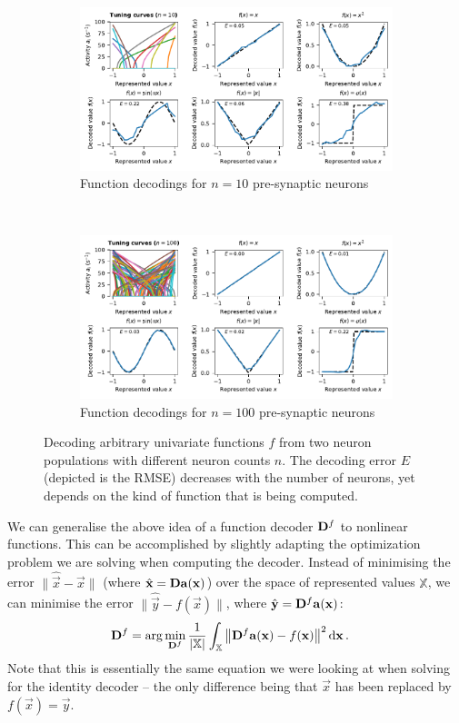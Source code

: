 \documentclass[10pt,letterpaper,oneside]{article}
\begin{document}
	\begin{figure}
		\begin{subfigure}{\textwidth}
			\centering
			\includegraphics{media/function_decodings_10.pdf}
			\caption{Function decodings for $n = 10$ pre-synaptic neurons}
		\end{subfigure}\\[1cm]
		\begin{subfigure}{\textwidth}
			\centering
			\includegraphics{media/function_decodings_100.pdf}
			\caption{Function decodings for $n = 100$ pre-synaptic neurons}
		\end{subfigure}
		\caption{Decoding arbitrary univariate functions $f$ from two neuron populations with different neuron counts $n$. The decoding error $E$ (depicted is the RMSE) decreases with the number of neurons, yet depends on the kind of function that is being computed. }
		\label{fig:function_decodings}
	\end{figure}

	We can generalise the above idea of a function decoder ${\mathbf{D}}^f$ to nonlinear functions. This can be accomplished by slightly adapting the optimization problem we are solving when computing the decoder. Instead of minimising the error $\| \hat{\vec x} - \vec x \|$ (where $\hat{{\mathbf{x}}} = {\mathbf{D}} {\mathbf{a}}({\mathbf{x}})$) over the space of represented values $\mathbb{X}$, we can minimise the error $\| \hat{\vec y} - f(\vec x) \|$, where $\hat{{\mathbf{y}}} = {\mathbf{D}}^f {\mathbf{a}}({\mathbf{x}})$:
	\begin{align*}
		{\mathbf{D}}^f &= \arg\min_{{\mathbf{D}}^f} \frac{1}{|\mathbb{X}|} \int_{\mathbb{X}} \big\| {\mathbf{D}}^f {\mathbf{a}}({\mathbf{x}}) - f({\mathbf{x}}) \big\|^2 \,\mathrm{d}{{\mathbf{x}}} \,.
	\end{align*}
	Note that this is essentially the same equation we were looking at when solving for the identity decoder -- the only difference being that $\vec x$ has been replaced by $f(\vec x) = \vec y$.
\end{document}
